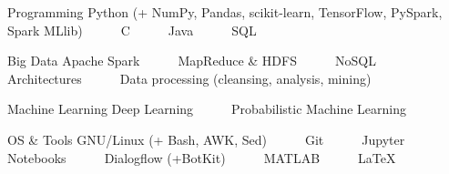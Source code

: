 

\begin{cvskills}

  \cvskill
    {Programming} %
    {Python (+ NumPy, Pandas, scikit-learn, TensorFlow, PySpark, Spark MLlib)~~~\textbullet~~~C~~~\textbullet~~~Java~~~\textbullet~~~SQL} %

  \cvskill
    {Big Data} %
    {Apache Spark~~~\textbullet~~~MapReduce \& HDFS~~~\textbullet~~~NoSQL Architectures~~~\textbullet~~~Data processing (cleansing, analysis, mining)} %

  \cvskill
    {Machine Learning} %
    {Deep Learning~~~\textbullet~~~Probabilistic Machine Learning} %

  \cvskill
    {OS \& Tools} %
    {GNU/Linux (+ Bash, AWK, Sed)~~~\textbullet~~~Git~~~\textbullet~~~Jupyter Notebooks~~~\textbullet~~~Dialogflow (+BotKit)~~~\textbullet~~~MATLAB~~~\textbullet~~~LaTeX} %

\end{cvskills}
